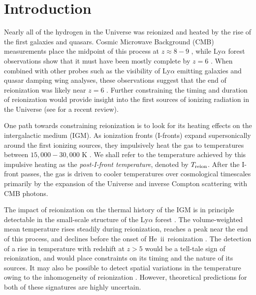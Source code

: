 \documentclass[twocolumn]{aastex62}
\newcommand{\HeII}{He{\sc~ii}}
\newcommand{\Treion}{T_{\rm reion}}
\begin{document}


\section{Introduction}

Nearly all of the hydrogen in the Universe was reionized and heated by the rise of the first galaxies and quasars.  Cosmic Microwave Background (CMB) measurements place the midpoint of this process at $z\approx 8-9$ \citep{2016A&amp;A...596A.108P}, while Ly$\alpha$ forest observations show that it must have been mostly complete by $z=6$ \citep{mcgreer15}.  When combined with other probes such as the visibility of Ly$\alpha$ emitting galaxies and quasar damping wing analyses, these observations suggest that the end of reionization was likely near $z=6$ \citep[e.g.][]{2007MNRAS.381...75M,2010ApJ...723..869O,2010MNRAS.408.1628S,2011ApJ...743..132P,2013MNRAS.429.1695B,2014MNRAS.443.2831C,2014MNRAS.437.2542T,2014arXiv1412.4790C,2015MNRAS.446..566M, 2018ApJ...856....2M, 2011Natur.474..616M,2018Natur.553..473B,2018arXiv180206066D}.  Further constraining the timing and duration of reionization would provide insight into the first sources of ionizing radiation in the Universe (see \citealt{2016ARA&A..54..313M} for a recent review).   

One path towards constraining reionization is to look for its heating effects on the intergalactic medium (IGM).  As ionization fronts (I-fronts) expand supersonically around the first ionizing sources, they impulsively heat the gas to temperatures between $15,000-30,000$ K \citep{1994MNRAS.266..343M, 1997MNRAS.292...27H, 2004MNRAS.348..753S, 2007MNRAS.380.1369T, 2008ApJ...689L..81T, 2011MNRAS.417.2264V, 2012MNRAS.426.1349M, 2018arXiv180500099F}.  We shall refer to the temperature achieved by this impulsive heating as the {\it post-I-front temperature}, denoted by $\Treion$.  After the I-front passes, the gas is driven to cooler temperatures over cosmological timescales primarily by the expansion of the Universe and inverse Compton scattering with CMB photons.  

The impact of reionization on the thermal history of the IGM is in principle detectable in the small-scale structure of the Ly$\alpha$ forest \citep[e.g.][]{2010ApJ...718..199L, 2011MNRAS.410.1096B, 2012MNRAS.424.1723G, 2017PhRvD..96b3522I}. The volume-weighted mean temperature rises steadily during reionization, reaches a peak near the end of this process, and declines before the onset of \HeII\ reionization \citep[e.g.][]{2016MNRAS.460.1885U, 2017arXiv171204464D, 2018arXiv180104931P}. The detection of a rise in temperature with redshift at $z>5$ would be a tell-tale sign of reionization, and would place constraints on its timing and the nature of its sources.  It may also be possible to detect spatial variations in the temperature owing to the inhomogeneity of reionization \citep{2008ApJ...689L..81T,2009ApJ...706L.164C,furlanetto09,2014ApJ...788..175L, 2015ApJ...813L..38D, 2018MNRAS.tmp..938K}.  However, theoretical predictions for both of these signatures are highly uncertain.  
  
\end{document}

